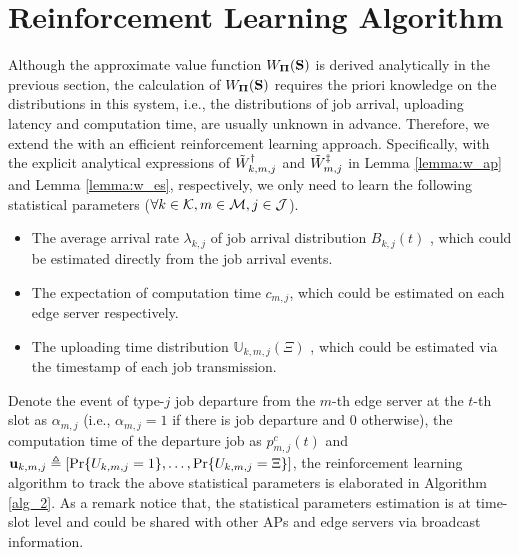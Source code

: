 \section{Reinforcement Learning Algorithm}
\label{sec:chapter3-rl-alg}
Although the approximate value function $W_{\mathbf{\Pi}}(\mathbf{S})$ is derived analytically in the previous section, the calculation of $ W_{\mathbf{\Pi}}(\mathbf{S})$ requires the priori knowledge on the distributions in this system, i.e., the distributions of job arrival, uploading latency and computation time, are usually unknown in advance.
Therefore, we extend the {\Dalgname} with an efficient reinforcement learning approach.
Specifically, with the explicit analytical expressions of $\tilde{W}^{\dagger}_{k,m,j}$ and $\tilde{W}^{\ddagger}_{m,j}$ in Lemma \ref{lemma:w_ap} and Lemma \ref{lemma:w_es}, respectively, we only need to learn the following statistical parameters ($\forall k\in\mathcal{K},m\in\mathcal{M}, j\in\mathcal{J}$).
\begin{itemize}
    \item The average arrival rate $\lambda_{k,j}$ of job arrival distribution $B_{k,j}(t)$ , which could be estimated directly from the job arrival events.
    \item The expectation of computation time $c_{m,j}$, which could be estimated on each edge server respectively.
    \item The uploading time distribution $\mathbb{U}_{k,m,j}(\Xi)$ , which could be estimated via the timestamp of each job transmission.
\end{itemize}
Denote the event of type-$j$ job departure from the $m$-th edge server at the $t$-th slot as $\alpha_{m,j}$ (i.e., $\alpha_{m,j}=1$ if there is job departure and $0$ otherwise), the computation time of the departure job as $p^{c}_{m,j}(t)$ and $\mathbf{u}_{k,m,j} \triangleq [\Pr\{U_{k,m,j}=1\}, \dots, \Pr\{U_{k,m,j}=\Xi\}]$, the reinforcement learning algorithm to track the above statistical parameters is elaborated in Algorithm \ref{alg_2}.
As a remark notice that, the statistical parameters estimation is at time-slot level and could be shared with other APs and edge servers via broadcast information.

